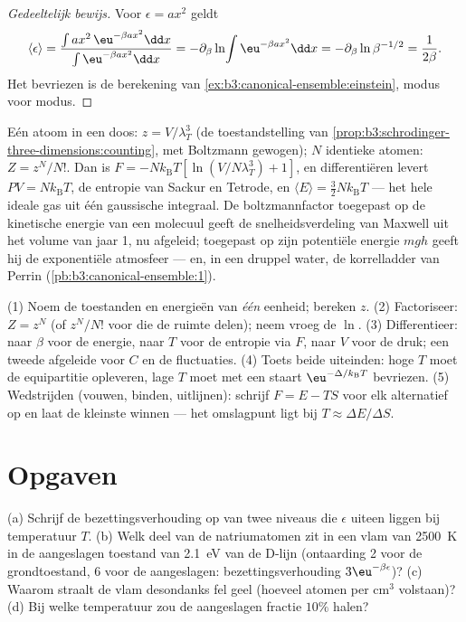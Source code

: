 \begin{proof}[Gedeeltelijk bewijs]
Voor $\epsilon = ax^2$ geldt
\[
\langle\epsilon\rangle
 = \frac{\int ax^2\,\eu^{-\beta ax^2}\dd x}
        {\int\eu^{-\beta ax^2}\dd x}
 = -\partial_\beta\ln\!\int\eu^{-\beta ax^2}\dd x
 = -\partial_\beta\ln\beta^{-1/2} = \frac{1}{2\beta} .
\] Het bevriezen is de berekening van
\cref{ex:b3:canonical-ensemble:einstein}, modus voor modus.
\end{proof}

\begin{example}\label{ex:b3:canonical-ensemble:gas}
Eén atoom in een doos: $z = V/\lambda_T^3$ (de toestandstelling van
\cref{prop:b3:schrodinger-three-dimensions:counting}, met Boltzmann
gewogen); $N$ identieke atomen: $Z = z^N/N!$. Dan is $F =
-Nk_{\text{B}}T[\ln(V/N\lambda_T^3) + 1]$, en differentiëren levert $PV = Nk_{\text{B}}T$, de entropie van Sackur en Tetrode, en $\langle E\rangle = \tfrac32 Nk_{\text{B}}T$ --- het hele ideale gas uit één gaussische
integraal. De boltzmannfactor toegepast op de kinetische energie van een
molecuul geeft de snelheidsverdeling van Maxwell uit het volume van jaar
1, nu afgeleid; toegepast op zijn potentiële energie $mgh$ geeft hij de
exponentiële atmosfeer --- en, in een druppel water, de korrelladder van
Perrin (\cref{pb:b3:canonical-ensemble:1}).
\end{example}

\begin{method}\label{met:b3:canonical-ensemble:method}
(1) Noem de toestanden en energieën van \emph{één} eenheid; bereken $z$.
(2) Factoriseer: $Z = z^N$ (of $z^N/N!$ voor  die de
ruimte delen); neem vroeg de $\ln$. (3) Differentieer: naar $\beta$ voor de
energie, naar $T$ voor de entropie via $F$, naar $V$ voor de druk; een
tweede afgeleide voor $C$ en de fluctuaties. (4) Toets beide uiteinden:
hoge $T$ moet de equipartitie opleveren, lage $T$ moet met een staart
$\eu^{-\Delta/k_{\text{B}}T}$ bevriezen. (5) Wedstrijden (vouwen, binden,
uitlijnen): schrijf $F = E - TS$ voor elk alternatief op en laat de
kleinste winnen --- het omslagpunt ligt bij $T \approx \Delta
E/\Delta S$.
\end{method}

\section{Opgaven}

\begin{exercise}[$\star$]\label{exo:b3:canonical-ensemble:1}
(a) Schrijf de bezettingsverhouding op van twee niveaus die $\epsilon$
uiteen liggen bij temperatuur $T$. (b) Welk deel van de natriumatomen zit
in een vlam van \qty{2500}{K} in de aangeslagen toestand van \qty{2.1}{eV}
van de D-lijn (ontaarding 2 voor de grondtoestand, 6 voor de aangeslagen:
bezettingsverhouding $3\eu^{-\beta\epsilon}$)?
(c) Waarom straalt de vlam desondanks fel geel (hoeveel atomen per
cm$^3$ volstaan)? (d) Bij welke temperatuur zou de aangeslagen fractie
$10\%$ halen?
\end{exercise}

